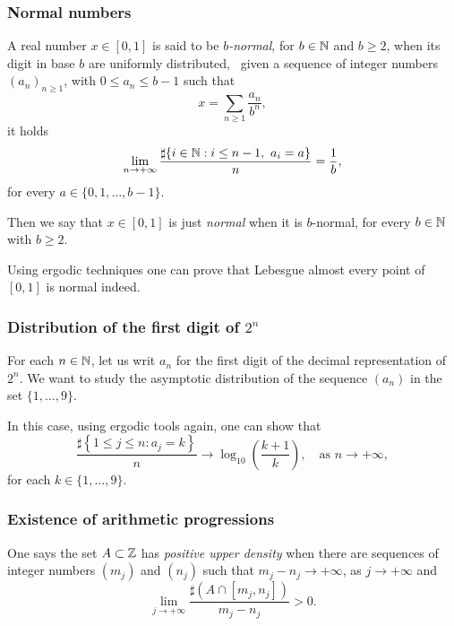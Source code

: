\subsubsection{Normal numbers}\label{sec:normal-numbers}

A real number $x\in [0,1]$ is said to be \emph{$b$-normal}, for $b\in\mathbb{N}$ and $b\geq 2$, when its digit in base $b$ are uniformly distributed, \ie~given a sequence of integer numbers $(a_n)_{n\geq 1}$, with $0\leq a_n\leq b-1$ such that
\begin{displaymath}
  x=\sum_{n\geq 1} \frac{a_n}{b^n},
\end{displaymath}
it holds
\begin{displaymath}
  \lim_{n\to+\infty}\frac{\sharp\{i\in\mathbb{N} : i\leq n-1,\ a_i=a\}}{n}=\frac{1}{b},
\end{displaymath}
for every $a\in\{0,1,\ldots,b-1\}$.

Then we say that $x\in[0,1]$ is just \emph{normal} when it is $b$-normal, for every $b\in\mathbb{N}$ with $b\geq 2$.

Using ergodic techniques one can prove that Lebesgue almost every point of $[0,1]$ is normal indeed.


\subsubsection{Distribution of the first digit of $2^n$}\label{sec:distr-firs-dig-2n}

For each $n\in\mathbb{N}$, let us writ $a_n$ for the first digit of the decimal representation of $2^n$. We want to study the asymptotic distribution of the sequence $(a_n)$ in the set $\{1,\ldots,9\}$.

In this case, using ergodic tools again, one can show that
\begin{displaymath}
  \frac{\sharp\left\{1\leq j\leq n : a_j=k\right\}}{n} \to\log_{10}\left(\frac{k+1}{k}\right), \quad\text{as } n\to+\infty,
\end{displaymath}
for each $k\in\{1,\ldots,9\}$.

\subsubsection{Existence of arithmetic progressions}\label{sec:exist-arit-progr}

One says the set $A\subset\mathbb{Z}$ has \emph{positive upper density} when there are sequences of integer numbers $(m_j)$ and $(n_j)$ such that $m_j-n_j\to+\infty$, as $j\to+\infty$ and
\begin{displaymath}
  \lim_{j\to+\infty} \frac{\sharp(A\cap [m_j,n_j])}{m_j-n_j} >0.
\end{displaymath}

